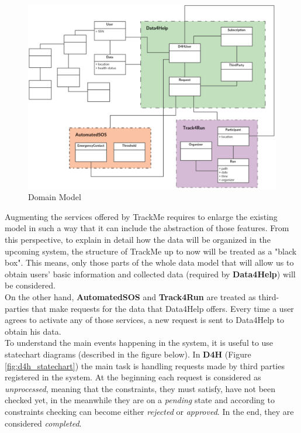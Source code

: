 \documentclass[hidelinks, 12pt]{report}
\begin{document}
 \begin{figure}[H]
\centering
 \includegraphics[scale=0.45]{Diagrams/domain_model.png}
\caption[Domain Model]{Domain Model}
\label{fig:domain_model}
\end{figure}

Augmenting the services offered by TrackMe requires to enlarge the existing model in such a way that it can include the abstraction of those features. From this perspective, to explain in detail how the data will be organized in the upcoming system, the structure of TrackMe up to now will be treated as a "black box". This means, only those parts of the whole data model that will allow us to obtain users' basic information and collected data (required by \textbf{Data4Help}) will be considered. \\

On the other hand, \textbf{AutomatedSOS} and \textbf{Track4Run} are treated as third-parties that make requests for the data that Data4Help offers. Every time a user agrees to activate any of those services, a new request is sent to Data4Help to obtain his data. \\

To understand the main events happening in the system, it is useful to use statechart diagrams (described in the figure below). In \textbf {D4H} (Figure \ref{fig:d4h_statechart}) the main task is handling requests made by third parties registered in the system. At the beginning each request is considered as \textit{unprocessed}, meaning that the constraints, they must satisfy, have not been checked yet, in the meanwhile they are on a \textit{pending} state and according to constraints checking can become either \textit{rejected} or \textit{approved}. In the end, they are considered \textit{completed}. \\
\end{document}
